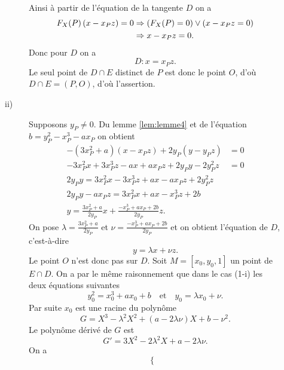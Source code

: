 \begin{demonstration}
\begin{description}
\begin{description}
                Ainsi à partir de l'équation de la tangente $D$ on a
                \begin{align*}
                    F_{X}(P)\left( x - x_Pz \right) = 0 &\Rightarrow \left( F_{X}(P) = 0\right) \vee \left( x - x_Pz = 0 \right) \\
                                                        &\Rightarrow x - x_Pz = 0
                .\end{align*}
                Donc pour $D$ on a 
                \[
                D : x = x_Pz
                .\] 
                Le seul point de $D \cap E$ distinct de $P$ est donc le point $O$, d'où $D \cap E = \left( P,O \right)$, d'où l'assertion.
            \item[ii)] Supposons $y_P \neq 0$. Du lemme \ref{lem:lemme4}  et de l'équation $b = y_P^2 - x_P^3 - ax_P$ on obtient
                \begin{align*}
                    - \left( 3x_P^2 + a \right) \left( x - x_Pz \right) + 2y_P\left( y - y_Pz \right) &= 0 \\
                    - 3x_P^2x + 3 x_P^3z - ax + ax_Pz + 2y_Py - 2y_P^2z &= 0 \\
                    2y_Py = 3x_P^2x - 3x_P^3z + ax - ax_Pz +2y_P^2z \\
                    2y_Py - ax_Pz = 3x_P^2x + ax - x_P^3z + 2b \\
                    y = \frac{3x_P^2 + a}{2y_P}x + \frac{- x_P^3 + ax_P + 2b}{2y_P}z
                .\end{align*}
                On pose $\lambda = \frac{3x_P^2 + a}{2y_P}$ et $\nu = \frac{- x_P^3 + ax_P + 2b}{2y_P}$ et on obtient l'équation de $D$, c'est-à-dire
                \[
                y = \lambda x + \nu z
                .\] 
                Le point $O$ n'est donc pas sur $D$. Soit $M = \left[ x_0, y_0, 1 \right]$ un
                point de $E \cap D$. On a par le même raisonnement que dans le cas (1-i)
                les deux équations suivantes
                \[
                y_0^2 = x_0^3 + ax_0 + b \quad \text{et} \quad y_0 = \lambda x_0 + \nu
                .\] 
                Par suite $x_0$ est une racine du polynôme
                \[
                G = X^3 - \lambda^2 X^2 + \left( a - 2\lambda\nu  \right)X + b - \nu^2
                .\] 
                Le polynôme dérivé de $G$ est
                \[
                G' = 3X^2 - 2\lambda^2 X + a - 2\lambda\nu
                .\] 
                On a
                \[
                    \begin{cases}

\end{cases}\]
\end{description}
\end{description}
\end{demonstration}

